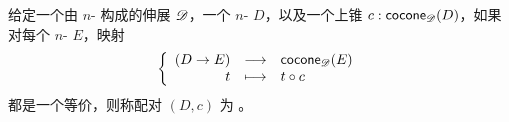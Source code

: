 \begin{defn}
  给定一个由 $n$-\type{} 构成的伸展 $\mathscr{D}$，一个 $n$-\type{} $D$，以及一个上锥
  $c:\mathsf{cocone}_{\mathscr{D}}(D)$，如果对每个 $n$-\type{} $E$，映射
  \[\left\{\begin{array}{rcl}(D\to{}E) & \longrightarrow & \mathsf{cocone}_{\mathscr{D}}(E) \\ t & \longmapsto & t\circ c \end{array}\right.\]
  都是一个等价，则称配对 $(D,c)$ 为 。
\end{defn}

